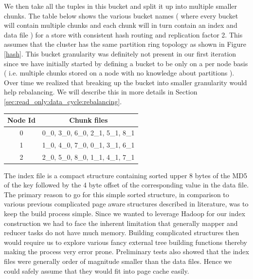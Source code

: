 \documentclass[10pt,twocolumn,preprint,natbib,authoryear]{sigplanconf}
\begin{document}
We then take all the tuples in this bucket and split it up into multiple smaller chunks. The table below shows the various bucket names ( where every bucket will contain multiple chunks and each chunk will in turn contain an index and data file ) for a store with consistent hash routing and replication factor 2. This assumes that the cluster has the same partition ring topology as shown in Figure \ref{hash}. This bucket granularity was definitely not present in our first iteration since we have initially started by defining a bucket to be only on a per node basis ( i.e. multiple chunks stored on a node with no knowledge about partitions ). Over time we realized that breaking up the bucket into smaller granularity would help rebalancing. We will describe this in more details in Section \ref{sec:read_only:data_cycle:rebalancing}. 

\begin{center}
    \begin{tabular}{ | c | c | }
    \hline
    Node Id & Chunk files \\ \hline
    0 &  0\_0, 3\_0, 6\_0,      2\_1, 5\_1,	8\_1	\\
   1 &   1\_0, 4\_0, 7\_0,      0\_1, 3\_1, 6\_1		\\
   2 &    2\_0, 5\_0, 8\_0,     1\_1, 4\_1, 7\_1		\\
\hline
    \end{tabular}
\end{center}


The index file is a compact structure containing sorted upper 8 bytes of the MD5 of the key followed by the 4 byte offset of the corresponding value in the data file. The primary reason to go for this simple sorted structure, in comparison to various previous complicated page aware structures described in literature, was to keep the build process simple. Since we wanted to leverage Hadoop for our index construction we had to face the inherent limitation that generally mapper and reducer tasks do not have much memory. Building complicated structures then would require us to explore various fancy external tree building functions thereby making the process very error prone. Preliminary tests also showed that the index files were generally order of magnitude smaller than the data files. Hence we could safely assume that they would fit into page cache easily. 
\end{document}
